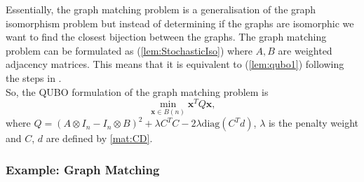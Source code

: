 \documentclass{article}
\begin{document}
\noindent Essentially, the graph matching problem is a generalisation of the graph isomorphism problem but instead of determining if the graphs are isomorphic we want to find the closest bijection between the graphs.
The graph matching problem can be formulated as (\ref{lem:StochasticIso}) where \(A,B\) are weighted adjacency matrices. This means that it is equivalent to (\ref{lem:qubo1}) following the steps in \cite{klus2023continuous}.\\

\noindent So, the QUBO formulation of the graph matching problem is
\begin{equation*}
	\min_{\mathbf{x} \in B(n)} \mathbf{x}^T Q \mathbf{x},
\end{equation*}
where \(Q = (A \otimes I_n - I_n \otimes B)^2 + \lambda C^T C - 2\lambda\text{diag}(C^T d)\), \(\lambda\) is the penalty weight and \(C\), \(d\) are defined by \ref{mat:CD}.\\

\subsubsection{Example: Graph Matching}
\end{document}
